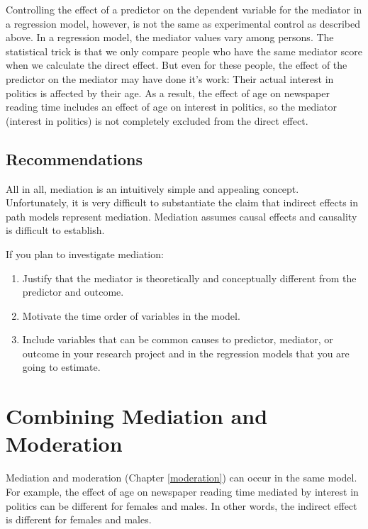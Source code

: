 \documentclass[a4paper]{book}
\theoremstyle{definition}
\theoremstyle{definition}
\theoremstyle{definition}
\theoremstyle{remark}
\begin{document}
Controlling the effect of a predictor on the dependent variable for the
mediator in a regression model, however, is not the same as experimental
control as described above. In a regression model, the mediator values
vary among persons. The statistical trick is that we only compare people
who have the same mediator score when we calculate the direct effect.
But even for these people, the effect of the predictor on the mediator
may have done it's work: Their actual interest in politics is affected
by their age. As a result, the effect of age on newspaper reading time
includes an effect of age on interest in politics, so the mediator
(interest in politics) is not completely excluded from the direct
effect.

\subsection{Recommendations}\label{recommendations}

All in all, mediation is an intuitively simple and appealing concept.
Unfortunately, it is very difficult to substantiate the claim that
indirect effects in path models represent mediation. Mediation assumes
causal effects and causality is difficult to establish.

If you plan to investigate mediation:

\begin{enumerate}
\def\labelenumi{\arabic{enumi}.}
\item
  Justify that the mediator is theoretically and conceptually different
  from the predictor and outcome.
\item
  Motivate the time order of variables in the model.
\item
  Include variables that can be common causes to predictor, mediator, or
  outcome in your research project and in the regression models that you
  are going to estimate.
\end{enumerate}

\section{Combining Mediation and
Moderation}\label{combining-mediation-and-moderation}

Mediation and moderation (Chapter \ref{moderation}) can occur in the
same model. For example, the effect of age on newspaper reading time
mediated by interest in politics can be different for females and males.
In other words, the indirect effect is different for females and males.
\end{document}

